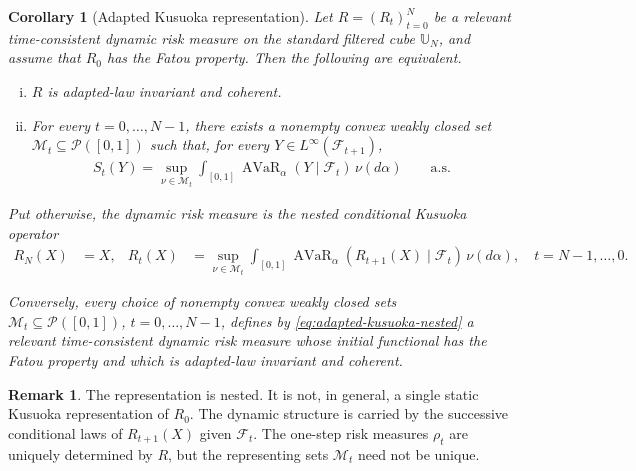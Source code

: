 \documentclass[a4paper]{amsart}
\newtheorem{corollary}[corollary]{Corollary}
\theoremstyle{definition}
\newtheorem{remark}[remark]{Remark}
\DeclareMathOperator{\AVaR}{AVaR}
\newcommand{\F}{\mathcal{F}}
\newcommand{\Pc}{\mathcal P}
\renewcommand{\subset}{\subseteq}
\begin{document}
\begin{corollary}[Adapted Kusuoka representation]
\label{cor:adapted-kusuoka}
Let \(R=(R_t)_{t=0}^N\) be a relevant time-consistent dynamic risk measure on
the standard filtered cube \(\mathbb U_N\), and assume that \(R_0\) has the
Fatou property. Then the following are equivalent.

\begin{enumerate}[(i)]
\item \(R\) is adapted-law invariant and coherent.

\item For every \(t=0,\dots,N-1\), there exists a nonempty convex weakly closed
set \(\mathcal M_t\subset\Pc([0,1])\) such that, for every
\(Y\in L^\infty(\F_{t+1})\),
\begin{align}
S_t(Y)
=
\sup_{\nu\in\mathcal M_t}
\int_{[0,1]}\AVaR_\alpha(Y\mid\F_t)\,\nu(d\alpha)
\qquad\text{a.s.}
\label{eq:adapted-kusuoka-one-step}
\end{align}
\end{enumerate}

Put otherwise, the dynamic risk measure is the
nested conditional Kusuoka operator
\begin{align}
R_N(X)&=X,
&
R_t(X)
&=
\sup_{\nu\in\mathcal M_t}
\int_{[0,1]}
\AVaR_\alpha(R_{t+1}(X)\mid\F_t)\,\nu(d\alpha),
\quad t=N-1,\dots,0.
\label{eq:adapted-kusuoka-nested}
\end{align}

Conversely, every choice of nonempty convex weakly closed sets
\(\mathcal M_t\subset\Pc([0,1])\), \(t=0,\dots,N-1\), defines by
\eqref{eq:adapted-kusuoka-nested} a relevant time-consistent dynamic risk
measure whose initial functional has the Fatou property and which is
adapted-law invariant and coherent.
\end{corollary}

\begin{remark}
\label{rem:kusuoka-nested-not-static}
The representation is nested. It is not, in general, a single static Kusuoka
representation of \(R_0\). The dynamic structure is carried by the successive
conditional laws of \(R_{t+1}(X)\) given \(\F_t\). The one-step risk measures
\(\rho_t\) are uniquely determined by \(R\), but the representing sets
\(\mathcal M_t\) need not be unique.
\end{remark}



\end{document}
